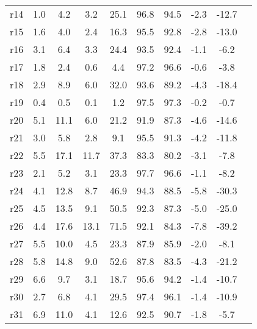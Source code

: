 \begin{tabular*}{\hsize}{ @{\extracolsep{\fill}}l*{9}{c}}
%
r14                      & 1.0     & 4.2     & 3.2     &25.1     &96.8     &94.5     &-2.3     &-12.7\\
%
r15                      & 1.6     & 4.0     & 2.4     &16.3     &95.5     &92.8     &-2.8     &-13.0\\
%
r16                      & 3.1     & 6.4     & 3.3     &24.4     &93.5     &92.4     &-1.1     &-6.2\\
%
r17                      & 1.8     & 2.4     & 0.6     & 4.4     &97.2     &96.6     &-0.6     &-3.8\\
%
r18                      & 2.9     & 8.9     & 6.0     &32.0     &93.6     &89.2     &-4.3     &-18.4\\
%
r19                      & 0.4     & 0.5     & 0.1     & 1.2     &97.5     &97.3     &-0.2     &-0.7\\
%
r20                      & 5.1     &11.1     & 6.0     &21.2     &91.9     &87.3     &-4.6     &-14.6\\
%
r21                      & 3.0     & 5.8     & 2.8     & 9.1     &95.5     &91.3     &-4.2     &-11.8\\
%
r22                      & 5.5     &17.1     &11.7     &37.3     &83.3     &80.2     &-3.1     &-7.8\\
%
r23                      & 2.1     & 5.2     & 3.1     &23.3     &97.7     &96.6     &-1.1     &-8.2\\
%
r24                      & 4.1     &12.8     & 8.7     &46.9     &94.3     &88.5     &-5.8     &-30.3\\
%
r25                      & 4.5     &13.5     & 9.1     &50.5     &92.3     &87.3     &-5.0     &-25.0\\
%
r26                      & 4.4     &17.6     &13.1     &71.5     &92.1     &84.3     &-7.8     &-39.2\\
%
r27                      & 5.5     &10.0     & 4.5     &23.3     &87.9     &85.9     &-2.0     &-8.1\\
%
r28                      & 5.8     &14.8     & 9.0     &52.6     &87.8     &83.5     &-4.3     &-21.2\\
%
r29                      & 6.6     & 9.7     & 3.1     &18.7     &95.6     &94.2     &-1.4     &-10.7\\
%
r30                      & 2.7     & 6.8     & 4.1     &29.5     &97.4     &96.1     &-1.4     &-10.9\\
%
r31                      & 6.9     &11.0     & 4.1     &12.6     &92.5     &90.7     &-1.8     &-5.7\\

\end{tabular*}
